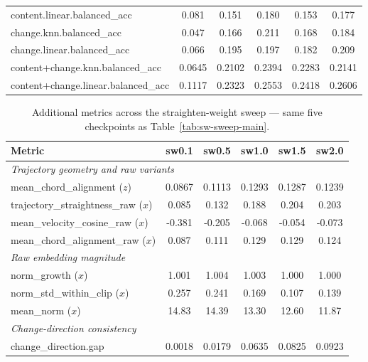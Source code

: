 \begin{table}[H]
\begin{tabular}{lccccc}
content.linear.balanced\_acc & 0.081 & 0.151 & 0.180 & 0.153 & 0.177 \\
change.knn.balanced\_acc & 0.047 & 0.166 & 0.211 & 0.168 & 0.184 \\
change.linear.balanced\_acc & 0.066 & 0.195 & 0.197 & 0.182 & 0.209 \\
content+change.knn.balanced\_acc & 0.0645 & 0.2102 & 0.2394 & 0.2283 & 0.2141 \\
content+change.linear.balanced\_acc & 0.1117 & 0.2323 & 0.2553 & 0.2418 & 0.2606 \\
\bottomrule
\end{tabular}
\end{table}

\begin{table}[H]
\centering
\caption{Additional metrics across the straighten-weight sweep --- same five checkpoints
as Table~\ref{tab:sw-sweep-main}.}
\label{tab:sw-sweep-additional}
\begin{tabular}{lccccc}
\toprule
Metric & sw0.1 & sw0.5 & sw1.0 & sw1.5 & sw2.0 \\
\midrule
\multicolumn{6}{l}{\textit{Trajectory geometry and raw variants}} \\
mean\_chord\_alignment ($z$) & 0.0867 & 0.1113 & 0.1293 & 0.1287 & 0.1239 \\
trajectory\_straightness\_raw ($x$) & 0.085 & 0.132 & 0.188 & 0.204 & 0.203 \\
mean\_velocity\_cosine\_raw ($x$) & -0.381 & -0.205 & -0.068 & -0.054 & -0.073 \\
mean\_chord\_alignment\_raw ($x$) & 0.087 & 0.111 & 0.129 & 0.129 & 0.124 \\
\midrule
\multicolumn{6}{l}{\textit{Raw embedding magnitude}} \\
norm\_growth ($x$) & 1.001 & 1.004 & 1.003 & 1.000 & 1.000 \\
norm\_std\_within\_clip ($x$) & 0.257 & 0.241 & 0.169 & 0.107 & 0.139 \\
mean\_norm ($x$) & 14.83 & 14.39 & 13.30 & 12.60 & 11.87 \\
\midrule
\multicolumn{6}{l}{\textit{Change-direction consistency}} \\
change\_direction.gap & 0.0018 & 0.0179 & 0.0635 & 0.0825 & 0.0923 \\
\bottomrule
\end{tabular}
\end{table}

